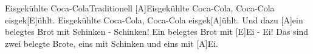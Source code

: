 \documentclass[../main.tex]{subfiles}
\begin{document}
\begin{songwithoutpagebreak}{Eisgekühlte Coca-Cola}{Traditionell}{}
[A]Eisgekühlte  Coca-Cola, Coca-Cola eisgek[E]{ü}hlt.
Eisgekühlte  Coca-Cola, Coca-Cola eisgek[A]{ü}hlt.
Und dazu [A]ein belegtes Brot mit Schinken - Schinken!
Ein belegtes Brot mit [E]Ei - Ei!
Das sind zwei belegte Brote, eins mit Schinken und eins mit [A]Ei.
\end{songwithoutpagebreak}
\end{document}

